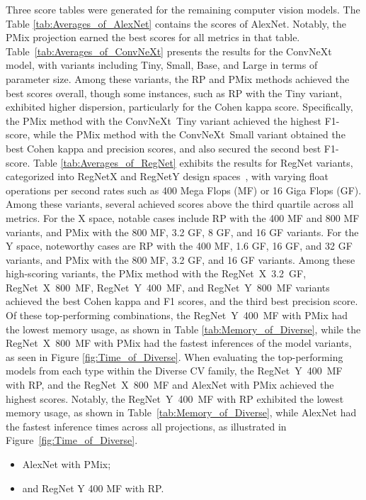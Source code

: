 Three score tables were generated for the remaining computer vision models.
The Table \ref{tab:Averages_of_AlexNet} contains the scores of AlexNet. Notably, the \gls{PMix} projection earned the best scores for all metrics in that table.
Table~\ref{tab:Averages_of_ConvNeXt} presents the results for the ConvNeXt model, with variants including Tiny, Small, Base, and Large in terms of parameter size. Among these variants, the \gls{RP} and \gls{PMix} methods achieved the best scores overall, though some instances, such as \gls{RP} with the Tiny variant, exhibited higher dispersion, particularly for the Cohen kappa score. Specifically, the \gls{PMix} method with the \mbox{ConvNeXt Tiny} variant achieved the highest F1-score, while the \gls{PMix} method with the \mbox{ConvNeXt Small} variant obtained the best Cohen kappa and precision scores, and also secured the second best F1-score.
Table \ref{tab:Averages_of_RegNet} exhibits the results for RegNet variants, categorized into RegNetX and RegNetY design spaces~\cite{RegNet}, with varying float operations per second rates such as 400 Mega Flops (MF) or 16 Giga Flops (GF). Among these variants, several achieved scores above the third quartile across all metrics. For the X space, notable cases include \gls{RP} with the 400 MF and 800 MF variants, and \gls{PMix} with the 800 MF, 3.2 GF, 8 GF, and 16 GF variants. For the Y space, noteworthy cases are \gls{RP} with the 400 MF, 1.6 GF, 16 GF, and 32 GF variants, and \gls{PMix} with the 800 MF, 3.2 GF, and 16 GF variants. Among these high-scoring variants, the \gls{PMix} method with the \mbox{RegNet X 3.2 GF}, \mbox{RegNet X 800 MF}, \mbox{RegNet Y 400 MF}, and \mbox{RegNet Y 800 MF} variants achieved the best Cohen kappa and F1 scores, and the third best precision score. Of these top-performing combinations, the \mbox{RegNet Y 400 MF} with \gls{PMix} had the lowest memory usage, as shown in Table \ref{tab:Memory_of_Diverse}, while the \mbox{RegNet X 800 MF} with \gls{PMix} had the fastest inferences of the model variants, as seen in Figure \ref{fig:Time_of_Diverse}.
When evaluating the top-performing models from each type within the Diverse \gls{CV} family, the \mbox{RegNet Y 400 MF} with \gls{RP}, and the \mbox{RegNet X 800 MF} and AlexNet with \gls{PMix} achieved the highest scores. Notably, the \mbox{RegNet Y 400 MF} with \gls{RP} exhibited the lowest memory usage, as shown in Table~\ref{tab:Memory_of_Diverse}, while AlexNet had the fastest inference times across all projections, as illustrated in Figure~\ref{fig:Time_of_Diverse}.  
\begin{itemize}
	\item AlexNet with \gls{PMix};
	\item and RegNet Y 400 MF with \gls{RP}.
\end{itemize}

